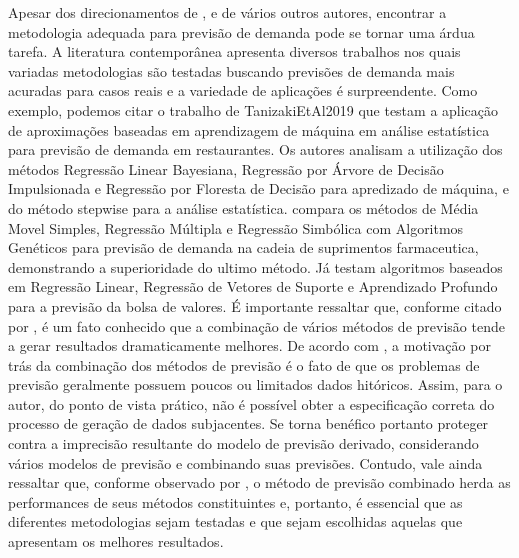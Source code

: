 \documentclass{book}
\begin{document}
Apesar dos direcionamentos de \cite{WankeJulianelli2006}, \cite{RubioEtAl2011} e de vários outros autores, encontrar a metodologia adequada para previsão de demanda pode se tornar uma árdua tarefa. A literatura contemporânea apresenta diversos trabalhos nos quais variadas metodologias são testadas buscando previsões de demanda mais acuradas para casos reais e a variedade de aplicações é surpreendente. Como exemplo, podemos citar o trabalho de {TanizakiEtAl2019} que testam a aplicação de aproximações baseadas em aprendizagem de máquina em análise estatística para previsão de demanda em restaurantes. Os autores analisam a utilização dos métodos Regressão Linear Bayesiana, Regressão por Árvore de Decisão Impulsionada e Regressão por Floresta de Decisão para apredizado de máquina, e do método stepwise para a análise estatística. \cite{MerkuryevaEtAl2019} compara os métodos de Média Movel Simples, Regressão Múltipla e Regressão Simbólica com Algoritmos Genéticos para previsão de demanda na cadeia de suprimentos farmaceutica, demonstrando a superioridade do ultimo método. Já \cite{MaqsoodEtAl2019} testam algoritmos baseados em Regressão Linear, Regressão de Vetores de Suporte e Aprendizado Profundo para a previsão da bolsa de valores. É importante ressaltar que, conforme citado por \cite{AndrawisEtAl2011}, é um fato conhecido que a combinação de vários métodos de previsão tende a gerar resultados dramaticamente melhores. De acordo com \cite{Atiya2019}, a motivação por trás da combinação dos métodos de previsão é o fato de que os problemas de previsão geralmente possuem poucos ou limitados dados hitóricos. Assim, para o autor, do ponto de vista prático, não é possível obter a especificação correta do processo de geração de dados subjacentes. Se torna benéfico portanto proteger contra a imprecisão resultante do modelo de previsão derivado, considerando vários modelos de previsão e combinando suas previsões. Contudo, vale ainda ressaltar que, conforme observado por \cite{AndrawisEtAl2011}, o método de previsão combinado herda as performances de seus métodos constituintes e, portanto, é essencial que as diferentes metodologias sejam testadas e que sejam escolhidas aquelas que apresentam os melhores resultados.
\end{document}
